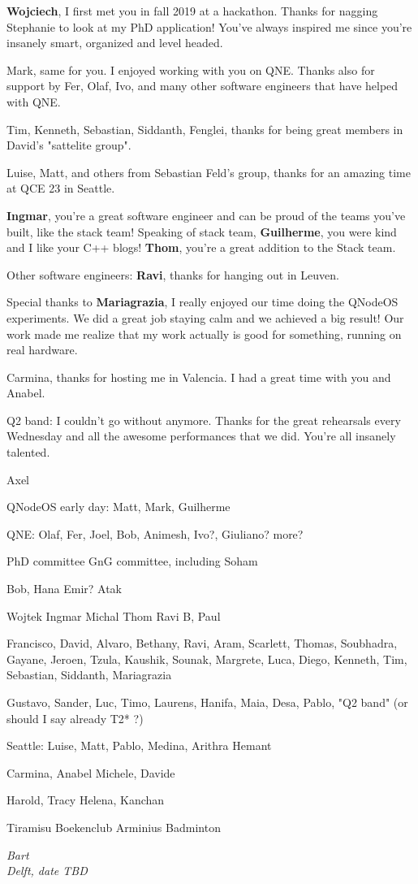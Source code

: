 \textbf{Wojciech}, I first met you in fall 2019 at a hackathon. Thanks for nagging Stephanie to look at my PhD application! You've always inspired me since you're insanely smart, organized and level headed.


Mark, same for you. I enjoyed working with you on QNE. Thanks also for support by Fer, Olaf, Ivo, and many other software engineers that have helped with QNE.

Tim, Kenneth, Sebastian, Siddanth, Fenglei, thanks for being great members in David's "sattelite group".

Luise, Matt, and others from Sebastian Feld's group, thanks for an amazing time at QCE 23 in Seattle.


\textbf{Ingmar}, you're a great software engineer and can be proud of the teams you've built, like the stack team!
Speaking of stack team, \textbf{Guilherme}, you were kind and I like your C++ blogs!
\textbf{Thom}, you're a great addition to the Stack team.

Other software engineers: \textbf{Ravi}, thanks for hanging out in Leuven.

Special thanks to \textbf{Mariagrazia}, I really enjoyed our time doing the QNodeOS experiments. We did a great job staying calm and we achieved a big result! Our work made me realize that my work actually is good for something, running on real hardware.

Carmina, thanks for hosting me in Valencia. I had a great time with you and Anabel.

Q2 band: I couldn't go without anymore. Thanks for the great rehearsals every Wednesday and all the awesome performances that we did. You're all insanely talented.






Axel

QNodeOS early day: Matt, Mark, Guilherme

QNE: Olaf, Fer, Joel, Bob, Animesh, Ivo?, Giuliano? more?

PhD committee
GnG committee, including Soham

Bob, Hana
Emir?
Atak

Wojtek
Ingmar
Michal
Thom
Ravi B, Paul

Francisco, David, Alvaro, Bethany, Ravi, Aram, Scarlett, Thomas, Soubhadra, Gayane, Jeroen, Tzula, Kaushik, Sounak, Margrete, Luca, Diego, Kenneth, Tim, Sebastian, Siddanth, 
Mariagrazia

Gustavo, Sander, Luc, Timo, Laurens, Hanifa, Maia, Desa, Pablo, "Q2 band" (or should I say already T2* ?)

Seattle: Luise, Matt, Pablo, Medina, Arithra
Hemant

Carmina, Anabel
Michele, Davide

Harold, Tracy
Helena, Kanchan



Tiramisu
Boekenclub
Arminius
Badminton


\begin{flushright}
{\itshape
Bart \\
Delft, date TBD
}
\end{flushright}

